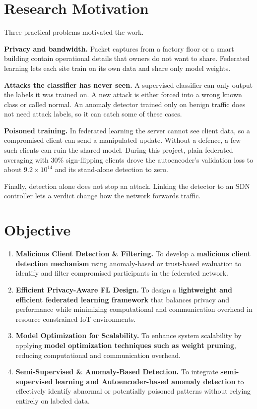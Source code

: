 \section{Research Motivation}
Three practical problems motivated the work.

\textbf{Privacy and bandwidth.} Packet captures from a factory floor or a smart building contain operational details that owners do not want to share. Federated learning lets each site train on its own data and share only model weights.

\textbf{Attacks the classifier has never seen.} A supervised classifier can only output the labels it was trained on. A new attack is either forced into a wrong known class or called normal. An anomaly detector trained only on benign traffic does not need attack labels, so it can catch some of these cases.

\textbf{Poisoned training.} In federated learning the server cannot see client data, so a compromised client can send a manipulated update. Without a defence, a few such clients can ruin the shared model. During this project, plain federated averaging with 30\% sign-flipping clients drove the autoencoder's validation loss to about $9.2\times10^{14}$ and its stand-alone detection to zero.

Finally, detection alone does not stop an attack. Linking the detector to an SDN controller lets a verdict change how the network forwards traffic.

\section{Objective}
\begin{enumerate}
  \item \textbf{Malicious Client Detection \& Filtering.} To develop a \textbf{malicious client detection mechanism} using anomaly-based or trust-based evaluation to identify and filter compromised participants in the federated network.
  \item \textbf{Efficient Privacy-Aware FL Design.} To design a \textbf{lightweight and efficient federated learning framework} that balances privacy and performance while minimizing computational and communication overhead in resource-constrained IoT environments.
  \item \textbf{Model Optimization for Scalability.} To enhance system scalability by applying \textbf{model optimization techniques such as weight pruning}, reducing computational and communication overhead.
  \item \textbf{Semi-Supervised \& Anomaly-Based Detection.} To integrate \textbf{semi-supervised learning and Autoencoder-based anomaly detection} to effectively identify abnormal or potentially poisoned patterns without relying entirely on labeled data.
\end{enumerate}

